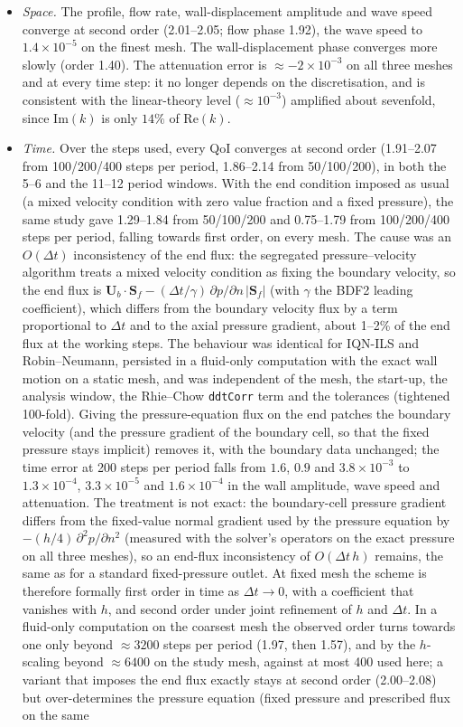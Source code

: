\begin{itemize}
	\item \emph{Space.} The profile, flow rate, wall-displacement amplitude and wave speed converge at second order (2.01--2.05; flow phase 1.92), the wave speed to $1.4\times10^{-5}$ on the finest mesh. The wall-displacement phase converges more slowly (order 1.40). The attenuation error is $\approx-2\times10^{-3}$ on all three meshes and at every time step: it no longer depends on the discretisation, and is consistent with the linear-theory level ($\approx10^{-3}$) amplified about sevenfold, since $\mathrm{Im}(k)$ is only $14\%$ of $\mathrm{Re}(k)$.
	\item \emph{Time.} Over the steps used, every QoI converges at second order (1.91--2.07 from 100/200/400 steps per period, 1.86--2.14 from 50/100/200), in both the 5--6 and the 11--12 period windows. With the end condition imposed as usual (a mixed velocity condition with zero value fraction and a fixed pressure), the same study gave 1.29--1.84 from 50/100/200 and 0.75--1.79 from 100/200/400 steps per period, falling towards first order, on every mesh. The cause was an $O(\Delta t)$ inconsistency of the end flux: the segregated pressure--velocity algorithm treats a mixed velocity condition as fixing the boundary velocity, so the end flux is $\mathbf{U}_b\cdot\mathbf{S}_f - (\Delta t/\gamma)\,\partial p/\partial n\,|\mathbf{S}_f|$ (with $\gamma$ the BDF2 leading coefficient), which differs from the boundary velocity flux by a term proportional to $\Delta t$ and to the axial pressure gradient, about 1--2\% of the end flux at the working steps. The behaviour was identical for IQN-ILS and Robin--Neumann, persisted in a fluid-only computation with the exact wall motion on a static mesh, and was independent of the mesh, the start-up, the analysis window, the Rhie--Chow \texttt{ddtCorr} term and the tolerances (tightened 100-fold). Giving the pressure-equation flux on the end patches the boundary velocity (and the pressure gradient of the boundary cell, so that the fixed pressure stays implicit) removes it, with the boundary data unchanged; the time error at 200 steps per period falls from $1.6$, $0.9$ and $3.8\times10^{-3}$ to $1.3\times10^{-4}$, $3.3\times10^{-5}$ and $1.6\times10^{-4}$ in the wall amplitude, wave speed and attenuation. The treatment is not exact: the boundary-cell pressure gradient differs from the fixed-value normal gradient used by the pressure equation by $-(h/4)\,\partial^2 p/\partial n^2$ (measured with the solver's operators on the exact pressure on all three meshes), so an end-flux inconsistency of $O(\Delta t\,h)$ remains, the same as for a standard fixed-pressure outlet. At fixed mesh the scheme is therefore formally first order in time as $\Delta t\to0$, with a coefficient that vanishes with $h$, and second order under joint refinement of $h$ and $\Delta t$. In a fluid-only computation on the coarsest mesh the observed order turns towards one only beyond $\approx3200$ steps per period (1.97, then 1.57), and by the $h$-scaling beyond $\approx6400$ on the study mesh, against at most 400 used here; a variant that imposes the end flux exactly stays at second order (2.00--2.08) but over-determines the pressure equation (fixed pressure and prescribed flux on the same 
\end{itemize}
